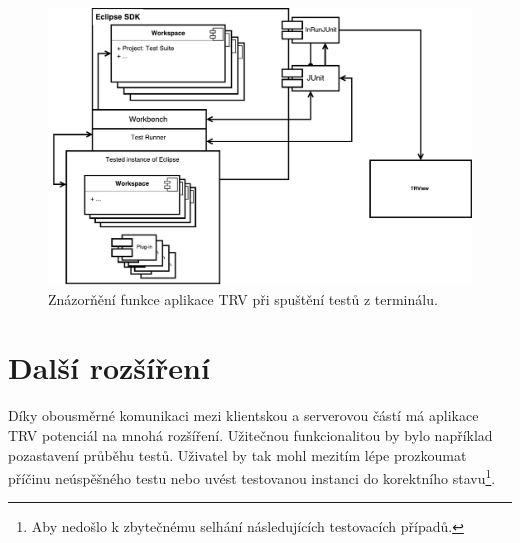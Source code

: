     \begin{figure}
	\includegraphics[width=\textwidth, center]{obrazky-figures/TRV_run_from_term.pdf}
	\caption{Znázorňění funkce aplikace TRV při spuštění testů z terminálu.}
	\label{fig:TRV_run_from_term}
      \end{figure}

  \section{Další rozšíření}
  Díky obousměrné komunikaci mezi klientskou a serverovou částí má aplikace TRV potenciál na mnohá rozšíření. Užitečnou funkcionalitou by bylo například pozastavení průběhu testů. Uživatel by tak mohl mezitím lépe prozkoumat příčinu neúspěšného testu nebo uvést testovanou instanci do korektního stavu\footnote{Aby nedošlo k zbytečnému selhání následujících testovacích případů.}. 
  
